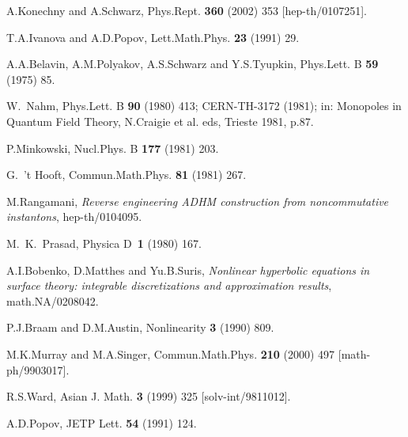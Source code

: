 \documentclass[a4paper,11pt]{article}
\numberwithin{equation}{section}
\begin{document}
\begin{thebibliography}{99}
A.Konechny and A.Schwarz, 
Phys.Rept. {\bf 360} (2002) 353	 [hep-th/0107251].

T.A.Ivanova and A.D.Popov,
Lett.Math.Phys. {\bf 23} (1991) 29.

A.A.Belavin, A.M.Polyakov, A.S.Schwarz and Y.S.Tyupkin,
Phys.Lett. B {\bf 59} (1975) 85.

W.~Nahm,
Phys.Lett. B {\bf 90} (1980) 413;
CERN-TH-3172 (1981);
in: Monopoles in Quantum Field Theory, N.Craigie et al. eds, Trieste 1981, p.87.

P.Minkowski,
Nucl.Phys. B {\bf 177} (1981) 203.

G.~'t Hooft,
Commun.Math.Phys. {\bf 81} (1981) 267.

M.Rangamani,
{\em Reverse engineering ADHM construction from noncommutative instantons},
hep-th/0104095.

M.~K.~Prasad,
Physica D~{\bf 1} (1980) 167.

A.I.Bobenko, D.Matthes and Yu.B.Suris, {\em Nonlinear hyperbolic equations 
in surface theory: integrable discretizations and approximation results},
math.NA/0208042.

P.J.Braam and D.M.Austin, Nonlinearity {\bf 3} (1990) 809.

M.K.Murray and M.A.Singer,
Commun.Math.Phys.  {\bf 210} (2000) 497
[math-ph/9903017].

 R.S.Ward, 
Asian J. Math. {\bf 3} (1999) 325 [solv-int/9811012].


A.D.Popov,
JETP Lett. {\bf 54} (1991) 124.


\end{thebibliography}
\end{document}
